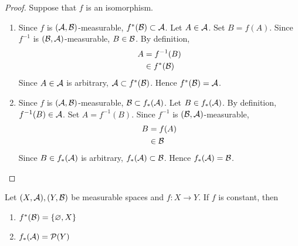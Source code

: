 \documentclass{book}
\begin{document}
	\begin{proof} Suppose that $f$ is an isomorphism.
		\begin{enumerate}
			\item Since $f$ is $(\mathcal{A}, \mathcal{B})$-measurable, $f^*(\mathcal{B}) \subset \mathcal{A}$. Let $A \in \mathcal{A}$. Set $B = f(A)$. Since $f^{-1}$ is $(\mathcal{B}, \mathcal{A})$-measurable, $B \in \mathcal{B}$. By definition, 
			\begin{align*}
				A 
				& = f^{-1}(B) \\
				& \in f^*(\mathcal{B})  
			\end{align*}
			Since $A \in \mathcal{A}$ is arbitrary, $\mathcal{A} \subset f^*(\mathcal{B})$. Hence $f^*(\mathcal{B}) = \mathcal{A}$.
			\item Since $f$ is $(\mathcal{A}, \mathcal{B})$-measurable, $\mathcal{B} \subset f_*(\mathcal{A})$. Let $B \in f_*(\mathcal{A})$. By definition, $f^{-1}(B) \in \mathcal{A}$. Set $A = f^{-1}(B)$.  Since $f^{-1}$ is $(\mathcal{B}, \mathcal{A})$-measurable, 
			\begin{align*}
				B
				& = f(A) \\
				& \in \mathcal{B}
			\end{align*}
			Since $B \in f_*(\mathcal{A})$ is arbitrary, $f_*(\mathcal{A}) \subset \mathcal{B}$. Hence $f_*(\mathcal{A}) = \mathcal{B}$.
		\end{enumerate}
	\end{proof}

	\begin{ex} 
		Let $(X,\mathcal{A}), (Y,\mathcal{B})$ be measurable spaces and $f: X \rightarrow Y$. If $f$ is constant, then 
		\begin{enumerate}
			\item $f^*(\mathcal{B}) = \{\varnothing, X\}$
			\item $f_*(\mathcal{A}) = \mathcal{P}(Y)$
		\end{enumerate}
	\end{ex}
\end{document}
